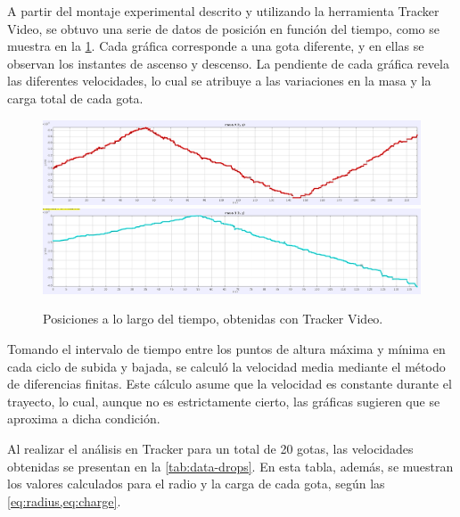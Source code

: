 A partir del montaje experimental descrito y utilizando la herramienta Tracker
Video, se obtuvo una serie de datos de posición en función del tiempo, como se
muestra en la \cref{fig:position}.
Cada gráfica corresponde a una gota diferente, y en ellas se observan los
instantes de ascenso y descenso.
La pendiente de cada gráfica revela las diferentes velocidades, lo cual se
atribuye a las variaciones en la masa y la carga total de cada gota.

\begin{figure}
	\centering
	\includegraphics[width=0.8\linewidth]{./images/positon-drop-tracker-00.png}
	\includegraphics[width=0.8\linewidth]{./images/positon-drop-tracker-01.png}
	\caption{Posiciones a lo largo del tiempo, obtenidas con Tracker Video.}
	\label{fig:position}
\end{figure}

Tomando el intervalo de tiempo entre los puntos de altura máxima y mínima en
cada ciclo de subida y bajada, se calculó la velocidad media mediante el método
de diferencias finitas.
Este cálculo asume que la velocidad es constante durante el trayecto, lo cual,
aunque no es estrictamente cierto, las gráficas sugieren que se aproxima a
dicha condición.

Al realizar el análisis en Tracker para un total de 20 gotas, las velocidades
obtenidas se presentan en la \cref{tab:data-drops}.
En esta tabla, además, se muestran los valores calculados para el radio y la
carga de cada gota, según las \cref{eq:radius,eq:charge}.

